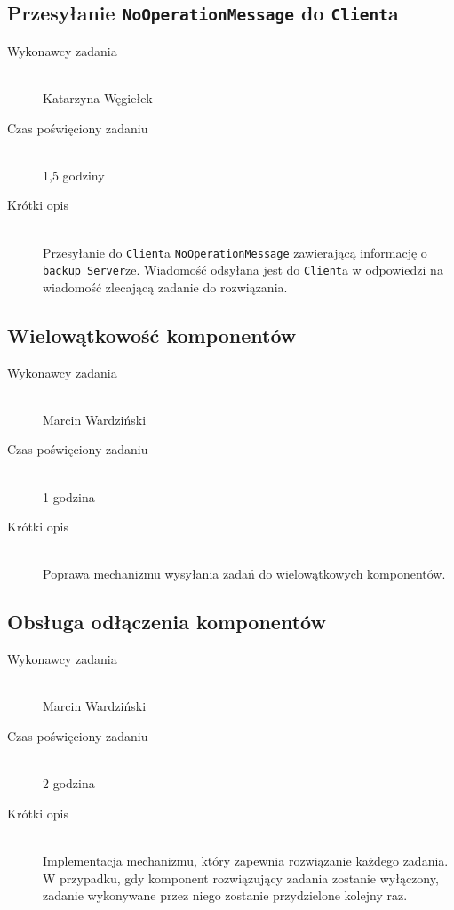 \documentclass[a4paper]{article}
\begin{document}
\subsection{Przesyłanie \texttt{NoOperationMessage} do \texttt{Client}a}
\begin{description}
    \item[Wykonawcy zadania] \hfill \\ Katarzyna Węgiełek
    \item[Czas poświęciony zadaniu] \hfill \\ 1,5 godziny
    \item[Krótki opis] \hfill \\ Przesyłanie do \texttt{Client}a \texttt{NoOperationMessage} zawierającą informację o \texttt{backup Server}ze. Wiadomość odsyłana jest do \texttt{Client}a w odpowiedzi na wiadomość zlecającą zadanie do rozwiązania.
\end{description}
   
\subsection{Wielowątkowość komponentów}
\begin{description}
    \item[Wykonawcy zadania] \hfill \\ Marcin Wardziński
    \item[Czas poświęciony zadaniu] \hfill \\ 1 godzina
    \item[Krótki opis] \hfill \\ Poprawa mechanizmu wysyłania zadań do wielowątkowych komponentów.
\end{description}   

\subsection{Obsługa odłączenia komponentów}
\begin{description}
    \item[Wykonawcy zadania] \hfill \\ Marcin Wardziński
    \item[Czas poświęciony zadaniu] \hfill \\ 2 godzina
    \item[Krótki opis] \hfill \\ Implementacja mechanizmu, który zapewnia rozwiązanie każdego zadania. W przypadku, gdy komponent rozwiązujący zadania zostanie wyłączony, zadanie wykonywane przez niego zostanie przydzielone kolejny raz.
\end{description}      
   
\end{document}
